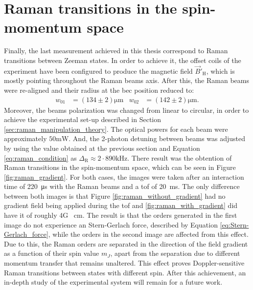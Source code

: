 \section{Raman transitions in the spin-momentum space}

Finally, the last measurement achieved in this thesis correspond to Raman transitions between Zeeman states. In order to achieve it, the offset coils of the experiment have been configured to produce the magnetic field $\vec{B}'_\text{H}$, which is mostly pointing throughout the Raman beams axis. After this, the Raman beams were re-aligned and their radius at the \ac{bec} position reduced to:
\begin{align*}
	w_{01} &= (134\pm2)\si{\micro\meter}   &   w_{02} &= (142\pm 2)\si{\micro\meter}.
\end{align*}
Moreover, the beams polarization was changed from linear to circular, in order to achieve the experimental set-up described in Section \ref{sec:raman_manipulation_theory}. The optical powers for each beam were approximately $50\si{\milli\watt}$. And, the 2-photon detuning between beams was adjusted by using the value obtained at the previous section and Equation \eqref{eq:raman_condition} as $\Delta_\text{R} \approx 2\cdot890 \si{\kilo\hertz}$. There result was the obtention of Raman transitions in the spin-momentum space, which can be seen in Figure \ref{fig:raman_gradient}. For both cases, the images were taken after an interaction time of \SI{220}{\micro\second} with the Raman beams and a \ac{tof} of \SI{20}{\milli\second}. The only difference between both images is that Figure \ref{fig:raman_without_gradient} had no gradient field being applied during the \ac{tof} and \ref{fig:raman_with_gradient} did have it of roughly 4G \si{\per\centi\meter}. The result is that the orders generated in the first image do not experience an Stern-Gerlach force, described by Equation \ref{eq:Stern-Gerlach_force}, while the orders in the second image are affected from this effect. Due to this, the Raman orders are separated in the direction of the field gradient as a function of their spin value $m_J$, apart from the separation due to different momentum transfer that remains unaltered. This effect proves Doppler-sensitive Raman transitions between states with different spin. After this achievement, an in-depth study of the experimental system will remain for a future work.

